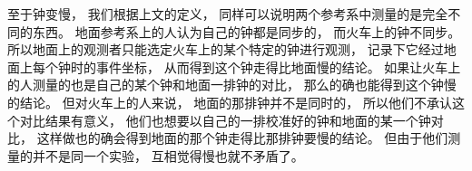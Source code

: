 至于钟变慢， 我们根据上文的定义， 同样可以说明两个参考系中测量的是完全不同的东西。 地面参考系上的人认为自己的钟都是同步的， 而火车上的钟不同步。 所以地面上的观测者只能选定火车上的某个特定的钟进行观测， 记录下它经过地面上每个钟时的事件坐标， 从而得到这个钟走得比地面慢的结论。 如果让火车上的人测量的也是自己的某个钟和地面一排钟的对比， 那么的确也能得到这个钟慢的结论。 但对火车上的人来说， 地面的那排钟并不是同时的， 所以他们不承认这个对比结果有意义， 他们也想要以自己的一排校准好的钟和地面的某一个钟对比， 这样做也的确会得到地面的那个钟走得比那排钟要慢的结论。 但由于他们测量的并不是同一个实验， 互相觉得慢也就不矛盾了。













